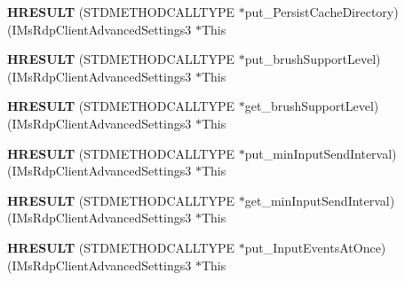 \begin{DoxyCompactItemize}
\item 
\mbox{\label{struct_i_ms_rdp_client_advanced_settings3_vtbl_accda8f89f7b08ba39bbcfca8cd7672f6}} 
{\bfseries H\+R\+E\+S\+U\+LT} (S\+T\+D\+M\+E\+T\+H\+O\+D\+C\+A\+L\+L\+T\+Y\+PE $\ast$put\+\_\+\+Persist\+Cache\+Directory)(I\+Ms\+Rdp\+Client\+Advanced\+Settings3 $\ast$This
\item 
\mbox{\label{struct_i_ms_rdp_client_advanced_settings3_vtbl_a6bb770ec6c3a49f2c85aa67b150f9f35}} 
{\bfseries H\+R\+E\+S\+U\+LT} (S\+T\+D\+M\+E\+T\+H\+O\+D\+C\+A\+L\+L\+T\+Y\+PE $\ast$put\+\_\+brush\+Support\+Level)(I\+Ms\+Rdp\+Client\+Advanced\+Settings3 $\ast$This
\item 
\mbox{\label{struct_i_ms_rdp_client_advanced_settings3_vtbl_ad681af9d900324b021c562d68188a08c}} 
{\bfseries H\+R\+E\+S\+U\+LT} (S\+T\+D\+M\+E\+T\+H\+O\+D\+C\+A\+L\+L\+T\+Y\+PE $\ast$get\+\_\+brush\+Support\+Level)(I\+Ms\+Rdp\+Client\+Advanced\+Settings3 $\ast$This
\item 
\mbox{\label{struct_i_ms_rdp_client_advanced_settings3_vtbl_a4a9e673e072aa6bd70a353c116038104}} 
{\bfseries H\+R\+E\+S\+U\+LT} (S\+T\+D\+M\+E\+T\+H\+O\+D\+C\+A\+L\+L\+T\+Y\+PE $\ast$put\+\_\+min\+Input\+Send\+Interval)(I\+Ms\+Rdp\+Client\+Advanced\+Settings3 $\ast$This
\item 
\mbox{\label{struct_i_ms_rdp_client_advanced_settings3_vtbl_ada1641e3de7b3183b58e3f396a7af63c}} 
{\bfseries H\+R\+E\+S\+U\+LT} (S\+T\+D\+M\+E\+T\+H\+O\+D\+C\+A\+L\+L\+T\+Y\+PE $\ast$get\+\_\+min\+Input\+Send\+Interval)(I\+Ms\+Rdp\+Client\+Advanced\+Settings3 $\ast$This
\item 
\mbox{\label{struct_i_ms_rdp_client_advanced_settings3_vtbl_a2d4c4e8cbdba336b422bdb3e0087fce4}} 
{\bfseries H\+R\+E\+S\+U\+LT} (S\+T\+D\+M\+E\+T\+H\+O\+D\+C\+A\+L\+L\+T\+Y\+PE $\ast$put\+\_\+\+Input\+Events\+At\+Once)(I\+Ms\+Rdp\+Client\+Advanced\+Settings3 $\ast$This
\item 
\mbox{\label{struct_i_ms_rdp_client_advanced_settings3_vtbl_a0684fb4884ad692568e6c0114d8f006c}} 

\end{DoxyCompactItemize}
